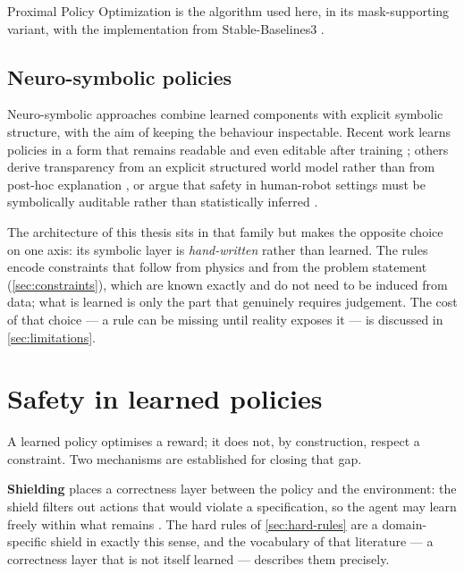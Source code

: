 Proximal Policy Optimization \cite{schulman2017ppo} is the algorithm used here, in its
mask-supporting variant, with the implementation from Stable-Baselines3 \cite{raffin2021sb3}.

\subsection{Neuro-symbolic policies}
Neuro-symbolic approaches combine learned components with explicit symbolic structure, with the
aim of keeping the behaviour inspectable. Recent work learns policies in a form that remains
readable and even editable after training \cite{baugh2025neuraldnfmt}; others derive transparency
from an explicit structured world model rather than from post-hoc explanation
\cite{hu2024graphworldmodels}, or argue that safety in human-robot settings must be symbolically
auditable rather than statistically inferred \cite{kozik2025explainable}.

The architecture of this thesis sits in that family but makes the opposite choice on one axis: its
symbolic layer is \emph{hand-written} rather than learned. The rules encode constraints that follow
from physics and from the problem statement (\cref{sec:constraints}), which are known exactly and
do not need to be induced from data; what is learned is only the part that genuinely requires
judgement. The cost of that choice --- a rule can be missing until reality exposes it --- is
discussed in \cref{sec:limitations}.

\section{Safety in learned policies}
\label{sec:safe-learning}

A learned policy optimises a reward; it does not, by construction, respect a constraint. Two
mechanisms are established for closing that gap.

\textbf{Shielding} places a correctness layer between the policy and the environment: the shield
filters out actions that would violate a specification, so the agent may learn freely within what
remains \cite{koenighofer2025shields}. The hard rules of \cref{sec:hard-rules} are a
domain-specific shield in exactly this sense, and the vocabulary of that literature --- a
correctness layer that is not itself learned --- describes them precisely.

